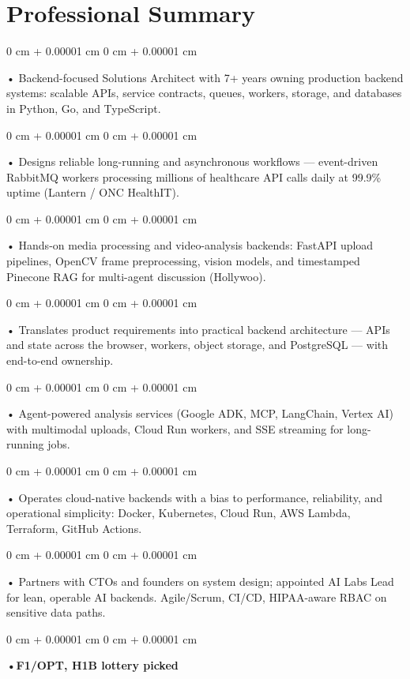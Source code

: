 \documentclass[10pt, letterpaper]{article}
\newenvironment{onecolentry}{
    \begin{adjustwidth}{
        0 cm + 0.00001 cm
    }{
        0 cm + 0.00001 cm
    }
}{
    \end{adjustwidth}
} %
\begin{document}
    \section{Professional Summary}
        \vspace{2 pt }
        \begin{onecolentry}
            • Backend-focused Solutions Architect with 7+ years owning production backend systems: scalable APIs, service contracts, queues, workers, storage, and databases in Python, Go, and TypeScript.
        \end{onecolentry}
        \begin{onecolentry}
            • Designs reliable long-running and asynchronous workflows — event-driven RabbitMQ workers processing millions of healthcare API calls daily at 99.9\% uptime (Lantern / ONC HealthIT).
        \end{onecolentry}
        \begin{onecolentry}
            • Hands-on media processing and video-analysis backends: FastAPI upload pipelines, OpenCV frame preprocessing, vision models, and timestamped Pinecone RAG for multi-agent discussion (Hollywoo).
        \end{onecolentry}
        \begin{onecolentry}
            • Translates product requirements into practical backend architecture — APIs and state across the browser, workers, object storage, and PostgreSQL — with end-to-end ownership.
        \end{onecolentry}
        \begin{onecolentry}
            • Agent-powered analysis services (Google ADK, MCP, LangChain, Vertex AI) with multimodal uploads, Cloud Run workers, and SSE streaming for long-running jobs.
        \end{onecolentry}
        \begin{onecolentry}
            • Operates cloud-native backends with a bias to performance, reliability, and operational simplicity: Docker, Kubernetes, Cloud Run, AWS Lambda, Terraform, GitHub Actions.
        \end{onecolentry}
        \begin{onecolentry}
            • Partners with CTOs and founders on system design; appointed AI Labs Lead for lean, operable AI backends. Agile/Scrum, CI/CD, HIPAA-aware RBAC on sensitive data paths.
        \end{onecolentry}
        \begin{onecolentry}
                \textbf{•F1/OPT, H1B lottery picked}
        \end{onecolentry}
\end{document}
